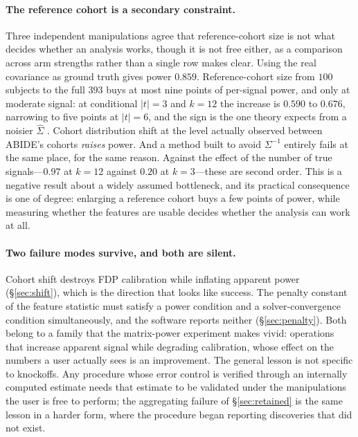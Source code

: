\documentclass[11pt,a4paper]{article}
\begin{document}
\paragraph{The reference cohort is a secondary constraint.}
Three independent manipulations agree that reference-cohort size is not what
decides whether an analysis works, though it is not free either, as a
comparison across arm strengths rather than a single row makes clear. Using the real covariance as ground
truth gives power $0.859$. Reference-cohort size from $100$ subjects to the
full $393$ buys at most nine points of per-signal power, and only at moderate
signal: at conditional $|t|=3$ and $k=12$ the increase is $0.590$ to $0.676$,
narrowing to five points at $|t|=6$, and the sign is the one theory expects
from a noisier $\hat\Sigma$ \citep{candes2018panning}. Cohort distribution
shift at the level actually observed between ABIDE's cohorts \emph{raises}
power. And a method built to avoid $\Sigma^{-1}$ entirely fails at the same
place, for the same reason. Against the effect of the number of true
signals---$0.97$ at $k=12$ against $0.20$ at $k=3$---these are second order.
This is a negative result about a widely assumed bottleneck, and its
practical consequence is one of degree: enlarging a reference cohort buys a
few points of power, while measuring whether the features are usable decides
whether the analysis can work at all.

\paragraph{Two failure modes survive, and both are silent.}
Cohort shift destroys FDP calibration while inflating apparent power
(\S\ref{sec:shift}), which is the direction that looks like success. The
penalty constant of the feature statistic must satisfy a power condition and
a solver-convergence condition simultaneously, and the software reports
neither (\S\ref{sec:penalty}). Both belong to a family that the
matrix-power experiment makes vivid: operations that increase apparent
signal while degrading calibration, whose effect on the numbers a user
actually sees is an improvement. The general lesson is not specific to
knockoffs. Any procedure whose error control is verified through an
internally computed estimate needs that estimate to be validated under the
manipulations the user is free to perform; the aggregating failure of
\S\ref{sec:retained} is the same lesson in a harder form, where the
procedure began reporting discoveries that did not exist.
\end{document}
